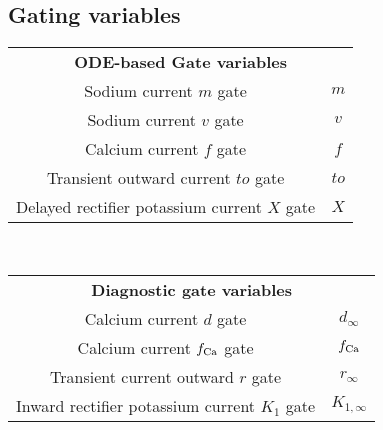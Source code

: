 \documentclass{scrartcl}
\begin{document}
\subsection{Gating variables}
\begin{table}[ht]
\centering
\begin{tabular}{cc}
\multicolumn{2}{c}{\bf ODE-based Gate variables}\\
Sodium current $m$ gate & $m$ \\
Sodium current $v$ gate & $v$ \\
Calcium current $f$ gate & $f$ \\
Transient outward current $to$ gate & $to$ \\
Delayed rectifier potassium current $X$ gate & $X$ 
\end{tabular}\\[1em]
%
\begin{tabular}{cc}
\multicolumn{2}{c}{\bf Diagnostic gate variables}\\
Calcium current $d$ gate & $d_{\infty}$\\
Calcium current $f_{\rm Ca}$ gate & $f_{\rm Ca}$ \\
Transient current outward $r$ gate & $r_{\infty}$ \\
Inward rectifier potassium current $K_1$ gate & $K_{1, \infty}$
\end{tabular}
\end{table}
%
%
\end{document}
